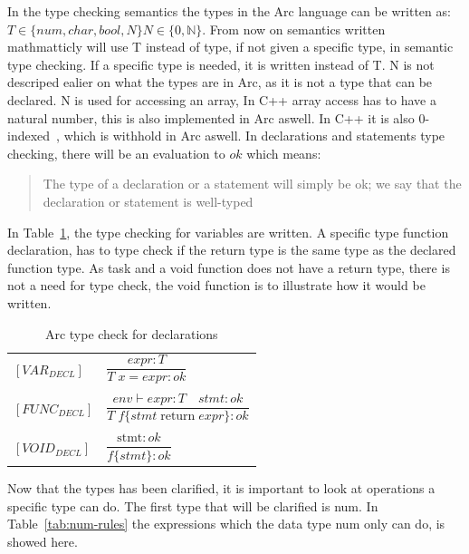 In the type checking semantics the types in the Arc language can be written as:
$T \in \{num, char, bool, N\} N \in \{ 0,\mathbb{N}\}$.
From now on semantics written mathmatticly will use T instead of type, if not given a specific type, in semantic type checking. If a specific type is needed, it is written instead of T.
N is not descriped ealier on what the types are in Arc, as it is not a type that can be declared. N is used for accessing an array, In C++ array access has to have a natural number, this is also implemented in Arc aswell. In C++ it is also 0-indexed~\cite{cppreferenceDataTypes}, which is withhold in Arc aswell.
In declarations and statements type checking, there will be an evaluation to $ok$ which means:

\blockcquote{Huttel2010}{The type of a declaration or a statement will simply be ok; we say that the declaration or statement is well-typed}

In Table~\ref*{tab:DeclTypeCheck}, the type checking for variables are written. A specific type function declaration, has to type check if the return type is the same type as the declared function type. As task and a void function does not have a return type, there is not a need for type check, the void function is to illustrate how it would be written.


\begin{table}[htb!]
    \centering
    \begin{tabular}{ll}
        \toprule
        $[VAR_{DECL}] $  & $\dfrac
            {expr : T}
            {T \;x = expr : ok}$
        \\
        \\
        $[FUNC_{DECL}] $ & $\dfrac
            {env \vdash expr : T \quad stmt : ok}
            {T \;f \{stmt \;\text{return} \; expr\}  : ok}$
        \\
        \\
        $[VOID_{DECL}] $ & $\dfrac
            {\text{stmt} : ok}
            {f\{stmt\}  : ok}$
        \\
        \bottomrule
    \end{tabular}
    \caption{Arc type check for declarations}
    \label{tab:DeclTypeCheck}
\end{table}


Now that the types has been clarified, it is important to look at operations a specific type can do.
The first type that will be clarified is num.
In Table~\ref{tab:num-rules} the expressions which the data type num only can do, is showed here.


